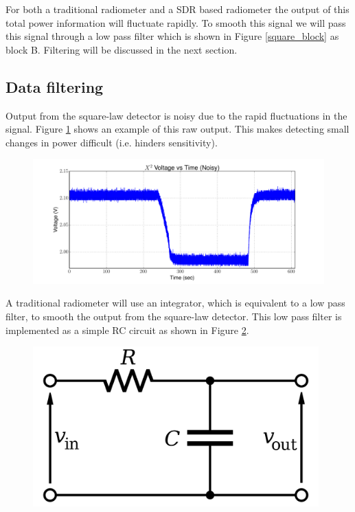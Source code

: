 For both a traditional radiometer and a SDR based radiometer the output of this total power information will fluctuate rapidly.  To smooth this signal we will pass this signal through a low pass filter which is shown in Figure \ref{square_block} as block B.  Filtering will be discussed in the next section.

\subsection{Data filtering}

Output from the square-law detector is noisy due to the rapid fluctuations in the signal.  Figure \ref{square_raw} shows an example of this raw output.  This makes detecting small changes in power difficult (i.e. hinders sensitivity).  

{\begin{figure}[h!tb] 
\centering
\includegraphics[width=17cm]{Experiments/Exp1/noisy_voltage.pdf}
\label{square_raw}
\end{figure}
}

A traditional radiometer will use an integrator, which is equivalent to a low pass filter, to smooth the output from the square-law detector.  This low pass filter is implemented as a simple RC circuit as shown in Figure \ref{rc_circuit}.  

{\begin{figure}[h!tb] 
\centering
\includegraphics[width=11cm]{Images/rc_lpf.png}
\label{rc_circuit}
\end{figure}
}

